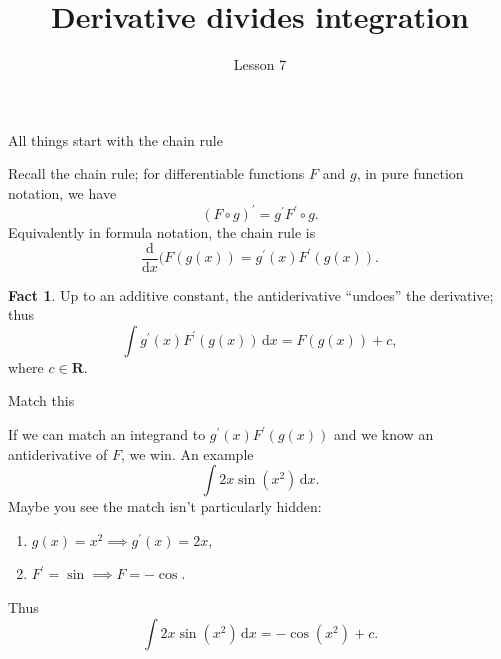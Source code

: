\documentclass[fleqn]{beamer}
\subtitle{Lesson 7}
\title{\textbf{Derivative divides integration}}
\date{}
\newcommand{\reals}{\mathbf{R}}
\theoremstyle{definition}
\newtheorem{myfact}{Fact}
\newenvironment{checklist}{
  \begin{enumerate}[\ding{51}]
    \addtolength{\itemsep}{-0.0\itemsep}}
  {\end{enumerate}}
\begin{document}
\frame{\titlepage}


\begin{frame}{All things start with the chain rule}
  
Recall the chain rule; for differentiable functions \(F\) and \(g\), 
in pure function notation, we have
\[
     (F \circ g)^\prime = g^\prime F^\prime \circ g.
\]  
Equivalently in formula notation, the chain rule is
\[
    \frac{\mathrm{d}}{\mathrm{d} x} (F (g(x)) = g^\prime(x) 
    F^\prime(g(x)).
\]  
\begin{myfact}
Up to an additive constant, the antiderivative ``undoes'' the derivative; thus
\[
\int g^\prime(x) F^\prime(g(x)) \, \mathrm{d} x  =  F (g(x))  + c,
\]   
where \(c \in \reals\).
\end{myfact}
\end{frame} 

\begin{frame}{Match this}

If we can match an integrand to  \(  g^\prime(x) F^\prime(g(x))  \) and we know an antiderivative of \(F\), we win.  An example
\[
    \int 2 x  \sin(x^2) \, \mathrm{d} x.
\]
Maybe you see the match isn't particularly hidden:

\begin{checklist}
\item \(g(x) = x^2   \implies g^\prime(x) = 2 x\),
\item \(F^\prime = \sin \implies F = -\cos \).
\end{checklist}

Thus
\[
    \int 2 x  \sin(x^2) \, \mathrm{d} x = -\cos(x^2) + c.
\]
\end{frame} 
\end{document}
